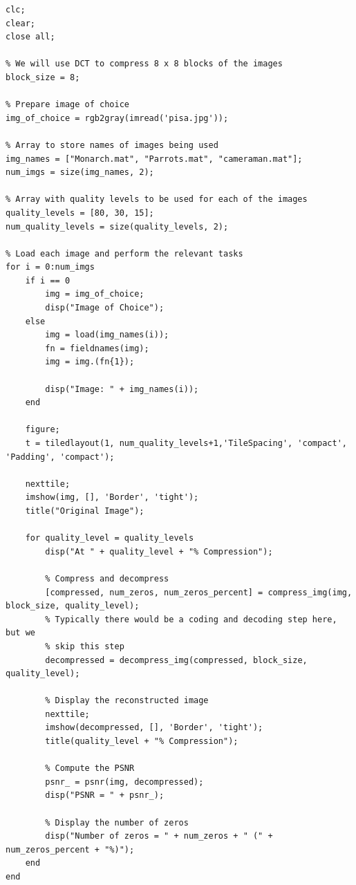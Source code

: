 \documentclass{article}[a4paper]
\begin{document}
	\begin{lstlisting}[caption={Main Code}, label=main]
clc;
clear;
close all;

% We will use DCT to compress 8 x 8 blocks of the images
block_size = 8;

% Prepare image of choice
img_of_choice = rgb2gray(imread('pisa.jpg'));

% Array to store names of images being used
img_names = ["Monarch.mat", "Parrots.mat", "cameraman.mat"];
num_imgs = size(img_names, 2);

% Array with quality levels to be used for each of the images
quality_levels = [80, 30, 15];
num_quality_levels = size(quality_levels, 2);

% Load each image and perform the relevant tasks
for i = 0:num_imgs
	if i == 0
		img = img_of_choice;
		disp("Image of Choice");
	else
		img = load(img_names(i));
		fn = fieldnames(img);
		img = img.(fn{1});
		
		disp("Image: " + img_names(i));
	end
	
	figure;
	t = tiledlayout(1, num_quality_levels+1,'TileSpacing', 'compact', 'Padding', 'compact');
	
	nexttile;
	imshow(img, [], 'Border', 'tight');
	title("Original Image");
	
	for quality_level = quality_levels
		disp("At " + quality_level + "% Compression");
		
		% Compress and decompress
		[compressed, num_zeros, num_zeros_percent] = compress_img(img, block_size, quality_level);
		% Typically there would be a coding and decoding step here, but we
		% skip this step
		decompressed = decompress_img(compressed, block_size, quality_level);
		
		% Display the reconstructed image
		nexttile;
		imshow(decompressed, [], 'Border', 'tight');
		title(quality_level + "% Compression");
		
		% Compute the PSNR
		psnr_ = psnr(img, decompressed);
		disp("PSNR = " + psnr_);
		
		% Display the number of zeros
		disp("Number of zeros = " + num_zeros + " (" + num_zeros_percent + "%)");
	end
end
	\end{lstlisting}
	
\end{document}
